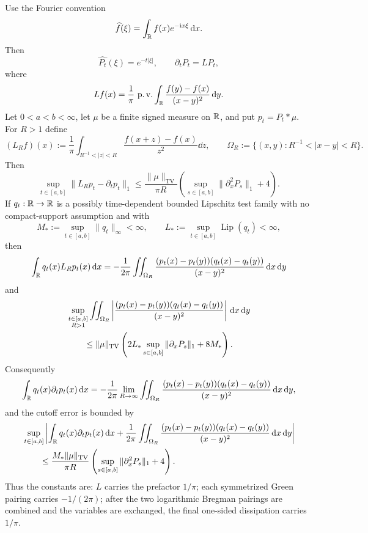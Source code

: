 \begin{lemma}%
\label{lem:kl-main-generator-convention-domain}
\label{lem:poisson-cauchy-generator-l1-domain}
\label{lem:bounded-lipschitz-cauchy-cutoff-pairing}
\label{lem:cauchy-normalization-bounded-test-green}
Use the Fourier convention
\[
\widehat f(\xi)=\int_{\mathbb{R}}f(x)e^{-\mathrm{i} x\xi}\,\mathrm{d} x .
\]
Then
\[
\widehat{P_t}(\xi)=e^{-t|\xi|},\qquad \partial_tP_t=LP_t,
\]
where
\[
Lf(x)=\frac1\pi\,\operatorname{p.v.}\int_{\mathbb{R}}
\frac{f(y)-f(x)}{(x-y)^2}\,\mathrm{d} y .
\]
Let \(0<a<b<\infty\), let \(\mu\) be a finite signed measure on \(\mathbb{R}\), and
put \(p_t=P_t*\mu\).  For \(R>1\) define
\[
(L_R f)(x):=\frac1\pi\int_{R^{-1}<|z|<R}
\frac{f(x+z)-f(x)}{z^2}\dd z,
\qquad
\Omega_R:=\{(x,y):R^{-1}<|x-y|<R\}.
\]
Then
\begin{equation}\label{eq:poisson-generator-annular-l1-estimate}
\sup_{t\in[a,b]}\|L_Rp_t-\partial_tp_t\|_1
\le
\frac{\|\mu\|_{\mathrm{TV}}}{\pi R}
\left(\sup_{s\in[a,b]}\|\partial_x^2P_s\|_1+4\right).
\end{equation}
If \(q_t:\mathbb{R}\to\mathbb{R}\) is a possibly time-dependent bounded Lipschitz test
family with no compact-support assumption and with
\[
M_*:=\sup_{t\in[a,b]}\|q_t\|_\infty<\infty,\qquad
L_*:=\sup_{t\in[a,b]}\operatorname{Lip}(q_t)<\infty ,
\]
then
\begin{equation}\label{eq:bounded-lipschitz-annular-green-finite}
\int_{\mathbb{R}}q_t(x)L_Rp_t(x)\,\mathrm{d} x
=-\frac1{2\pi}\iint_{\Omega_R}
\frac{(p_t(x)-p_t(y))(q_t(x)-q_t(y))}{(x-y)^2}\,\mathrm{d} x\,\mathrm{d} y
\end{equation}
and
\begin{align}
&\sup_{\substack{t\in[a,b]\\R>1}}
\iint_{\Omega_R}
\left|
\frac{(p_t(x)-p_t(y))(q_t(x)-q_t(y))}{(x-y)^2}
\right|\,\mathrm{d} x\,\mathrm{d} y \notag\\
&\qquad\le
\|\mu\|_{\mathrm{TV}}
\left(2L_*\sup_{s\in[a,b]}\|\partial_xP_s\|_1+8M_*\right).
\label{eq:bounded-lipschitz-annular-total-variation-bound}
\end{align}
Consequently
\begin{equation}\label{eq:bounded-lipschitz-annular-green-limit}
\int_{\mathbb{R}}q_t(x)\partial_tp_t(x)\,\mathrm{d} x
=-\frac1{2\pi}\lim_{R\to\infty}\iint_{\Omega_R}
\frac{(p_t(x)-p_t(y))(q_t(x)-q_t(y))}{(x-y)^2}\,\mathrm{d} x\,\mathrm{d} y ,
\end{equation}
and the cutoff error is bounded by
\begin{align}
&\sup_{t\in[a,b]}
\left|
\int_{\mathbb{R}}q_t(x)\partial_tp_t(x)\,\mathrm{d} x
+\frac1{2\pi}\iint_{\Omega_R}
\frac{(p_t(x)-p_t(y))(q_t(x)-q_t(y))}{(x-y)^2}\,\mathrm{d} x\,\mathrm{d} y
\right| \notag\\
&\qquad\le
\frac{M_*\|\mu\|_{\mathrm{TV}}}{\pi R}
\left(\sup_{s\in[a,b]}\|\partial_x^2P_s\|_1+4\right).
\label{eq:bounded-lipschitz-time-dependent-cutoff-error}
\end{align}
Thus the constants are: \(L\) carries the prefactor \(1/\pi\);
each symmetrized Green pairing carries \(-1/(2\pi)\); after the two
logarithmic Bregman pairings are combined and the variables are exchanged,
the final one-sided dissipation carries \(1/\pi\).
\end{lemma}


